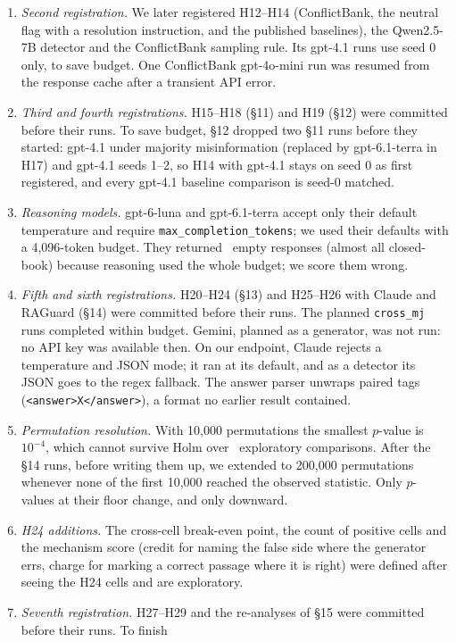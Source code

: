 \begin{enumerate}[leftmargin=*,itemsep=1pt,topsep=2pt]
(Appendix~\ref{app:single}) was chosen after seeing the minimal-skeleton run and is exploratory.
\item \emph{Second registration.} We later registered H12--H14 (ConflictBank, the neutral flag with a
resolution instruction, and the published baselines), the Qwen2.5-7B detector and the ConflictBank sampling rule.
Its gpt-4.1 runs use seed 0 only, to save budget. One ConflictBank gpt-4o-mini run was resumed from the
response cache after a transient API error.
\item \emph{Third and fourth registrations.} H15--H18 (\S11) and H19 (\S12) were committed before their runs. To save
budget, \S12 dropped two \S11 runs before they started: gpt-4.1 under majority misinformation (replaced by
gpt-6.1-terra in H17) and gpt-4.1 seeds 1--2, so H14 with gpt-4.1 stays on seed 0 as first registered, and every
gpt-4.1 baseline comparison is seed-0 matched.
\item \emph{Reasoning models.} gpt-6-luna and gpt-6.1-terra accept only their default temperature and require
\texttt{max\_completion\_tokens}; we used their defaults with a 4,096-token budget. They returned
\Nempty\ empty responses (almost all closed-book) because reasoning used the whole budget; we score them wrong.
\item \emph{Fifth and sixth registrations.} H20--H24 (\S13) and H25--H26 with Claude and RAGuard (\S14) were
committed before their runs. The planned \texttt{cross\_mj} runs completed within budget. Gemini, planned
as a generator, was not run: no API key was available then. On our endpoint, Claude rejects a temperature and JSON mode; it
ran at its default, and as a detector its JSON goes to the regex fallback. The answer
parser unwraps paired tags (\texttt{<answer>X</answer>}), a format no earlier result contained.
\item \emph{Permutation resolution.} With 10,000 permutations the smallest $p$-value is $10^{-4}$, which cannot
survive Holm over \nExploratory\ exploratory comparisons. After the \S14 runs, before writing them up, we
extended to 200,000 permutations whenever none of the first 10,000 reached the observed statistic. Only
$p$-values at their floor change, and only downward.
\item \emph{H24 additions.} The cross-cell break-even point, the count of positive cells and the mechanism score
(credit for naming the false side where the generator errs, charge for marking a correct passage where it is right)
were defined after seeing the H24 cells and are exploratory.
\item \emph{Seventh registration.} H27--H29 and the re-analyses of \S15 were committed before their runs. To finish

\end{enumerate}
